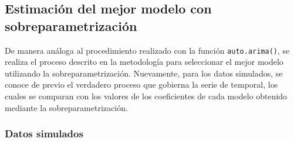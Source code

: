 \documentclass[
]{article}
\begin{document}
\begin{table}[!h]

\caption{\label{tab:unnamed-chunk-25}\label{tab:coeficientes_reales_autoarima}Coefcientes de los modelos ajustados con a las series reales con auto.arima()}
\centering
{}
\end{table}

\subsection{Estimación del mejor modelo con sobreparametrización}

De manera análoga al procedimiento realizado con la función
\texttt{auto.arima()}, se realiza el proceso descrito en la metodología
para seleccionar el mejor modelo utilizando la sobreparametrización.
Nuevamente, para los datos simulados, se conoce de previo el verdadero
proceso que gobierna la serie de temporal, los cuales se comparan con
los valores de los coeficientes de cada modelo obtenido mediante la
sobreparametrización.

\subsubsection{Datos simulados}
\end{document}
